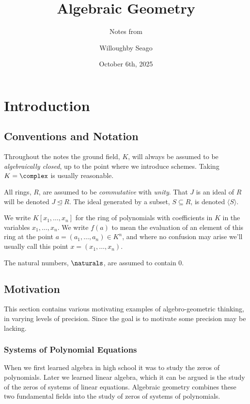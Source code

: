 \documentclass[fleqn]{NotesClass}
\title{Algebraic Geometry}
\author{Willoughby Seago}
\date{October 6th, 2025}
\subtitle{Notes from}
\newcommand{\subideal}{\trianglelefteq}
\begin{document}
    \frontmatter
    \titlepage
    \innertitlepage{}
    \tableofcontents
    \listoffigures
    \mainmatter
    
    \chapter{Introduction}
    
    \section{Conventions and Notation}
    Throughout the notes the ground field, \(K\), will always be assumed to be \emph{algebraically closed}, up to the point where we introduce schemes.
    Taking \(K = \complex\) is usually reasonable.
    
    All rings, \(R\), are assumed to be \emph{commutative} with \emph{unity}.
    That \(J\) is an ideal of \(R\) will be denoted \(J \subideal R\).
    The ideal generated by a subset, \(S \subseteq R\), is denoted \(\langle S \rangle\).
    
    We write \(K[x_1, \dotsc, x_n]\) for the ring of polynomials with coefficients in \(K\) in the variables \(x_1, \dotsc, x_n\).
    We write \(f(a)\) to mean the evaluation of an element of this ring at the point \(a = (a_1, \dotsc, a_n) \in K^n\), and where no confusion may arise we'll usually call this point \(x = (x_1, \dotsc, x_n)\).
    
    The natural numbers, \(\naturals\), are assumed to contain \(0\).
    
    \section{Motivation}
    This section contains various motivating examples of algebro-geometric thinking, in varying levels of precision.
    Since the goal is to motivate some precision may be lacking.
    
    \subsection{Systems of Polynomial Equations}
    When we first learned algebra in high school it was to study the zeros of polynomials.
    Later we learned linear algebra, which it can be argued is the study of the zeros of systems of linear equations.
    Algebraic geometry combines these two fundamental fields into the study of zeros of systems of polynomials.
    
\end{document}
